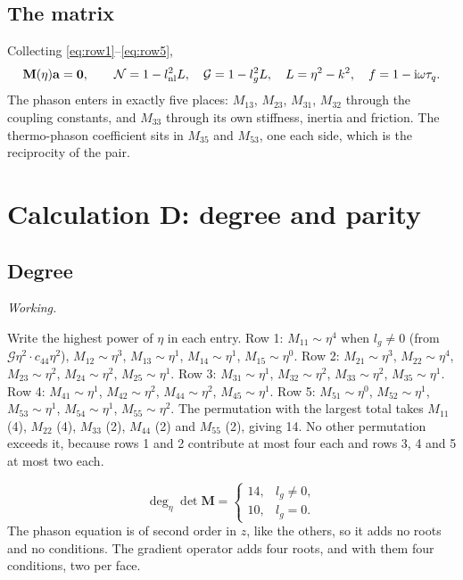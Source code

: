 \documentclass[11pt,a4paper]{article}
\newif\ifshowworked \showworkedtrue
\newenvironment{worked}{\ifshowworked\par\smallskip\noindent\textit{Working.}\par\else\setbox0\vbox\bgroup\fi}{\ifshowworked\par\smallskip\else\egroup\fi}
\newcommand{\Gc}{\mathcal{G}}
\newcommand{\ii}{\mathrm{i}}
\begin{document}
\subsection{The matrix}

Collecting \eqref{eq:row1}--\eqref{eq:row5},
\begin{equation}\label{eq:M}
\mathbf M(\eta)\mathbf a=\mathbf 0,\qquad
\mathcal N=1-l_{\rm nl}^2L,\quad \mathcal G=1-l_g^2L,\quad L=\eta^2-k^2,\quad f=1-\ii\omega\tau_q .
\end{equation}
The phason enters in exactly five places: $M_{13}$, $M_{23}$, $M_{31}$, $M_{32}$ through the coupling
constants, and $M_{33}$ through its own stiffness, inertia and friction. The thermo-phason coefficient sits in
$M_{35}$ and $M_{53}$, one each side, which is the reciprocity of the pair.

\section{Calculation D: degree and parity}\label{sec:D}

\subsection{Degree}

\begin{worked}
Write the highest power of $\eta$ in each entry. Row 1: $M_{11}\sim\eta^4$ when $l_g\ne0$ (from
$\Gc\eta^2\cdot c_{44}\eta^2$), $M_{12}\sim\eta^3$, $M_{13}\sim\eta^1$, $M_{14}\sim\eta^1$, $M_{15}\sim\eta^0$.
Row 2: $M_{21}\sim\eta^3$, $M_{22}\sim\eta^4$, $M_{23}\sim\eta^2$, $M_{24}\sim\eta^2$, $M_{25}\sim\eta^1$.
Row 3: $M_{31}\sim\eta^1$, $M_{32}\sim\eta^2$, $M_{33}\sim\eta^2$, $M_{35}\sim\eta^1$.
Row 4: $M_{41}\sim\eta^1$, $M_{42}\sim\eta^2$, $M_{44}\sim\eta^2$, $M_{45}\sim\eta^1$.
Row 5: $M_{51}\sim\eta^0$, $M_{52}\sim\eta^1$, $M_{53}\sim\eta^1$, $M_{54}\sim\eta^1$, $M_{55}\sim\eta^2$.
The permutation with the largest total takes $M_{11}$ (4), $M_{22}$ (4), $M_{33}$ (2), $M_{44}$ (2) and
$M_{55}$ (2), giving 14. No other permutation exceeds it, because rows 1 and 2 contribute at most four each
and rows 3, 4 and 5 at most two each.
\end{worked}

\noindent
\begin{equation}\label{eq:deg}
\deg_\eta\det\mathbf M=\begin{cases}14,&l_g\ne0,\\10,&l_g=0 .\end{cases}
\end{equation}
The phason equation is of second order in $z$, like the others, so it adds no roots and no conditions. The
gradient operator adds four roots, and with them four conditions, two per face.
\end{document}
